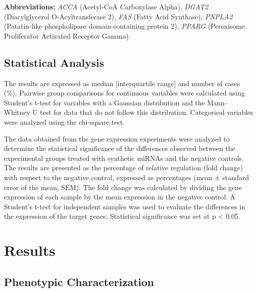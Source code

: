 \documentclass[
  11pt,
  letterpaper,
]{book}
\begin{document}
\endgroup{}

\vspace{-1em}
\begin{flushleft}
\footnotesize{\textbf{Abbreviations:} 
\textit{ACCA} (Acetyl-CoA Carboxylase Alpha), 
\textit{DGAT2} (Diacylglycerol O-Acyltransferase 2), 
\textit{FAS} (Fatty Acid Synthase), 
\textit{PNPLA2} (Patatin-like phospholipase domain-containing protein 2), 
\textit{PPARG} (Peroxisome Proliferator Activated Receptor Gamma).}
\end{flushleft}

\section{Statistical Analysis}\label{statistical-analysis}

The results are expressed as median {[}interquartile range{]} and number
of cases (\%). Pairwise group comparisons for continuous variables were
calculated using Student's t-test for variables with a Gaussian
distribution and the Mann--Whitney U test for data that do not follow
this distribution. Categorical variables were analyzed using the
chi-square test.

The data obtained from the gene expression experiments were analyzed to
determine the statistical significance of the differences observed
between the experimental groups treated with synthetic miRNAs and the
negative controls. The results are presented as the percentage of
relative regulation (fold change) with respect to the negative control,
expressed as percentages (mean ± standard error of the mean, SEM). The
fold change was calculated by dividing the gene expression of each
sample by the mean expression in the negative control. A Student's
t-test for independent samples was used to evaluate the differences in
the expression of the target genes. Statistical significance was set at
p \textless{} 0.05.

\chapter{Results}\label{results}

\section{Phenotypic Characterization}\label{phenotypic-characterization}
\end{document}
